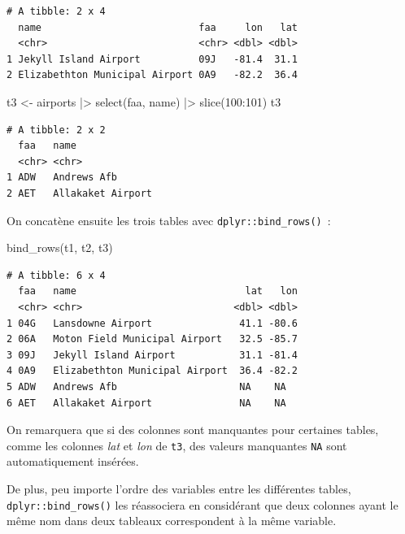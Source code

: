 \documentclass[
  letterpaper,
  DIV=11,
  numbers=noendperiod,
  oneside]{scrreprt}
\newenvironment{Shaded}{\begin{snugshade}}{\end{snugshade}}
\newcommand{\DecValTok}[1]{\textcolor[rgb]{0.68,0.00,0.00}{#1}}
\newcommand{\FunctionTok}[1]{\textcolor[rgb]{0.28,0.35,0.67}{#1}}
\newcommand{\NormalTok}[1]{\textcolor[rgb]{0.00,0.23,0.31}{#1}}
\newcommand{\OtherTok}[1]{\textcolor[rgb]{0.00,0.23,0.31}{#1}}
\newcommand{\SpecialCharTok}[1]{\textcolor[rgb]{0.37,0.37,0.37}{#1}}
\begin{document}
\begin{verbatim}
# A tibble: 2 x 4
  name                           faa     lon   lat
  <chr>                          <chr> <dbl> <dbl>
1 Jekyll Island Airport          09J   -81.4  31.1
2 Elizabethton Municipal Airport 0A9   -82.2  36.4
\end{verbatim}

\begin{Shaded}
\begin{Highlighting}[]
\NormalTok{t3 }\OtherTok{\textless{}{-}}\NormalTok{ airports }\SpecialCharTok{|\textgreater{}} 
  \FunctionTok{select}\NormalTok{(faa, name) }\SpecialCharTok{|\textgreater{}} 
  \FunctionTok{slice}\NormalTok{(}\DecValTok{100}\SpecialCharTok{:}\DecValTok{101}\NormalTok{)}
\NormalTok{t3}
\end{Highlighting}
\end{Shaded}

\begin{verbatim}
# A tibble: 2 x 2
  faa   name             
  <chr> <chr>            
1 ADW   Andrews Afb      
2 AET   Allakaket Airport
\end{verbatim}

On concatène ensuite les trois tables avec
\texttt{dplyr::bind\_rows()}~:

\begin{Shaded}
\begin{Highlighting}[]
\FunctionTok{bind\_rows}\NormalTok{(t1, t2, t3)}
\end{Highlighting}
\end{Shaded}

\begin{verbatim}
# A tibble: 6 x 4
  faa   name                             lat   lon
  <chr> <chr>                          <dbl> <dbl>
1 04G   Lansdowne Airport               41.1 -80.6
2 06A   Moton Field Municipal Airport   32.5 -85.7
3 09J   Jekyll Island Airport           31.1 -81.4
4 0A9   Elizabethton Municipal Airport  36.4 -82.2
5 ADW   Andrews Afb                     NA    NA  
6 AET   Allakaket Airport               NA    NA  
\end{verbatim}

On remarquera que si des colonnes sont manquantes pour certaines tables,
comme les colonnes \emph{lat} et \emph{lon} de \texttt{t3}, des valeurs
manquantes \texttt{NA} sont automatiquement insérées.

De plus, peu importe l'ordre des variables entre les différentes tables,
\texttt{dplyr::bind\_rows()} les réassociera en considérant que deux
colonnes ayant le même nom dans deux tableaux correspondent à la même
variable.
\end{document}
